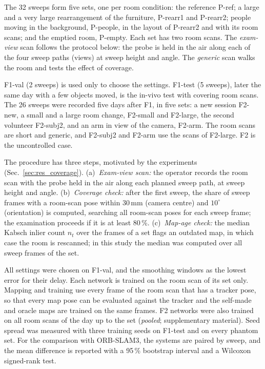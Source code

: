 \documentclass[9pt,shortpaper,twoside,web]{ieeecolor2}
\newcommand{\Pref}{P-ref}
\newcommand{\Prearra}{P-rearr1}
\newcommand{\Prearrb}{P-rearr2}
\newcommand{\Ppeople}{P-people}
\newcommand{\Pempty}{P-empty}
\newcommand{\Fone}{F1}
\newcommand{\Fval}{F1-val}
\newcommand{\Ftest}{F1-test}
\newcommand{\Ftwo}{F2}
\newcommand{\Fnew}{F2-new}
\newcommand{\Fsmall}{F2-small}
\newcommand{\Flarge}{F2-large}
\newcommand{\Fsubj}{F2-subj2}
\newcommand{\Farm}{F2-arm}
\begin{document}
The 32 sweeps form five sets, one per room condition: the reference \Pref{}; a large and a very large rearrangement of the furniture, \Prearra{} and \Prearrb{}; people moving in the background, \Ppeople{}, in the layout of \Prearrb{} and with its room scans; and the emptied room, \Pempty{}. Each set has two room scans. The \emph{exam-view} scan follows the protocol below: the probe is held in the air along each of the four sweep paths (views) at sweep height and angle. The \emph{generic} scan walks the room and tests the effect of coverage.

\Fval{} (2 sweeps) is used only to choose the settings. \Ftest{} (5 sweeps), later the same day with a few objects moved, is the in-vivo test with covering room scans. The 26 sweeps were recorded five days after \Fone{}, in five sets: a new session \Fnew{}, a small and a large room change, \Fsmall{} and \Flarge{}, the second volunteer \Fsubj{}, and an arm in view of the camera, \Farm{}. The room scans are short and generic, and \Fsubj{} and \Farm{} use the scans of \Flarge{}. \Ftwo{} is the uncontrolled case.


The procedure has three steps, motivated by the experiments (Sec.~\ref{sec:res_coverage}). (a)~\emph{Exam-view scan:} the operator records the room scan with the probe held in the air along each planned sweep path, at sweep height and angle. (b)~\emph{Coverage check:} after the first sweep, the share of sweep frames with a room-scan pose within 30\,mm (camera centre) and $10^\circ$ (orientation) is computed, searching all room-scan poses for each sweep frame; the examination proceeds if it is at least 80\,\%. (c)~\emph{Map-age check:} the median Kabsch inlier count $n_t$ over the frames of a set flags an outdated map, in which case the room is rescanned; in this study the median was computed over all sweep frames of the set.

All settings were chosen on \Fval{}, and the smoothing windows as the lowest error for their delay. Each network is trained on the room scan of its set only. Mapping and training use every frame of the room scan that has a tracker pose, so that every map pose can be evaluated against the tracker and the self-made and oracle maps are trained on the same frames. \Ftwo{} networks were also trained on all room scans of the day up to the set (\emph{pooled}; supplementary material). Seed spread was measured with three training seeds on \Ftest{} and on every phantom set. For the comparison with ORB-SLAM3, the systems are paired by sweep, and the mean difference is reported with a 95\,\% bootstrap interval and a Wilcoxon signed-rank test.
\end{document}
